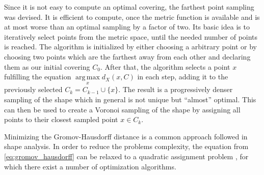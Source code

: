 Since it is not easy to compute an optimal covering, the farthest point sampling was devised.
It is efficient to compute, once the metric function is available and is at most worse than an optimal sampling by a factor of two.
Its basic idea is to iteratively select points from the metric space, until the needed number of points is reached.
The algorithm is initialized by either choosing a arbitrary point or by choosing two points which are the farthest away from each other and declaring them as our initial covering $C_0$.
After that, the algorithm selects a point $x$ fulfilling the equation $\underset{x}{\operatorname{arg\,max}} d_X(x,C)$ in each step, adding it to the previously selected $C_k = C_{k-1} \cup \{x\}$.
The result is a progressively denser sampling of the shape which in general is not unique but ``almost'' optimal.
This can then be used to create a Voronoi sampling of the shape by assigning all points to their closest sampled point $x \in C_k$.

Minimizing the Gromov-Hausdorff distance is a common approach followed in shape analysis.
In order to reduce the problems complexity, the equation from \eqref{eq:gromov_hausdorff} can be relaxed to a quadratic assignment problem \cite{memoli2007use}, for which there exist a number of optimization algorithms.
